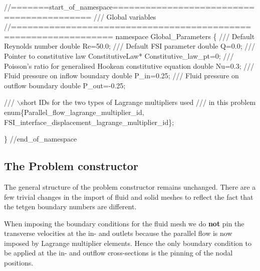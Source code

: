  
\begin{DoxyCodeInclude}
\textcolor{comment}{//=======start\_of\_namespace==========================================}
\textcolor{comment}{/// Global variables}
\textcolor{comment}{}\textcolor{comment}{//================================================================}
\textcolor{keyword}{namespace }Global\_Parameters
\{
\textcolor{comment}{}
\textcolor{comment}{ /// Default Reynolds number}
\textcolor{comment}{} \textcolor{keywordtype}{double} Re=50.0; 
\textcolor{comment}{}
\textcolor{comment}{ /// Default FSI parameter}
\textcolor{comment}{} \textcolor{keywordtype}{double} Q=0.0;
\textcolor{comment}{}
\textcolor{comment}{ /// Pointer to constitutive law}
\textcolor{comment}{} ConstitutiveLaw* Constitutive\_law\_pt=0;
\textcolor{comment}{}
\textcolor{comment}{ /// Poisson's ratio for generalised Hookean constitutive equation}
\textcolor{comment}{} \textcolor{keywordtype}{double} Nu=0.3;
 \textcolor{comment}{}
\textcolor{comment}{ /// Fluid pressure on inflow boundary}
\textcolor{comment}{} \textcolor{keywordtype}{double} P\_in=0.25;
\textcolor{comment}{}
\textcolor{comment}{ /// Fluid pressure on outflow boundary}
\textcolor{comment}{} \textcolor{keywordtype}{double} P\_out=-0.25; 

\textcolor{comment}{}
\textcolor{comment}{ /// \(\backslash\)short IDs for the two types of Lagrange multipliers used}
\textcolor{comment}{ /// in this problem}
\textcolor{comment}{} \textcolor{keyword}{enum}\{Parallel\_flow\_lagrange\_multiplier\_id, 
      FSI\_interface\_displacement\_lagrange\_multiplier\_id\};
 
\} \textcolor{comment}{//end\_of\_namespace}

\end{DoxyCodeInclude}




\hypertarget{index_constructor}{}\subsection{The Problem constructor}\label{index_constructor}
The general structure of the problem constructor remains unchanged. There are a few trivial changes in the import of fluid and solid meshes to reflect the fact that the tetgen boundary numbers are different.

When imposing the boundary conditions for the fluid mesh we do {\bfseries  not } pin the transverse velocities at the in-\/ and outlets because the parallel flow is now imposed by Lagrange multiplier elements. Hence the only boundary condition to be applied at the in-\/ and outflow cross-\/sections is the pinning of the nodal positions.

